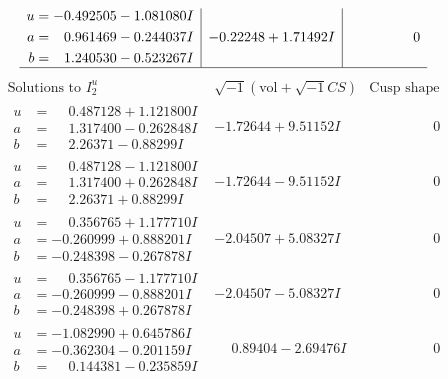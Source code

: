 \documentclass[1p]{elsarticle_modified}
\theoremstyle{definition}
\newcommand{\I}{\sqrt{-1}}
\begin{document}
$$\begin{array}{c|c|c}
\begin{aligned}
u &= -0.492505 - 1.081080 I \\
a &= \phantom{-}0.961469 - 0.244037 I \\
b &= \phantom{-}1.240530 - 0.523267 I\end{aligned}
 & -0.22248 + 1.71492 I & \phantom{-0.000000 } 0\\
 \hline 
 \end{array}$$\newpage$$\begin{array}{c|c|c}  
\text{Solutions to }I^u_{2}& \I (\text{vol} + \sqrt{-1}CS) & \text{Cusp shape}\\
 \hline 
\begin{aligned}
u &= \phantom{-}0.487128 + 1.121800 I \\
a &= \phantom{-}1.317400 - 0.262848 I \\
b &= \phantom{-}2.26371 - 0.88299 I\end{aligned}
 & -1.72644 + 9.51152 I & \phantom{-0.000000 } 0 \\ \hline\begin{aligned}
u &= \phantom{-}0.487128 - 1.121800 I \\
a &= \phantom{-}1.317400 + 0.262848 I \\
b &= \phantom{-}2.26371 + 0.88299 I\end{aligned}
 & -1.72644 - 9.51152 I & \phantom{-0.000000 } 0 \\ \hline\begin{aligned}
u &= \phantom{-}0.356765 + 1.177710 I \\
a &= -0.260999 + 0.888201 I \\
b &= -0.248398 - 0.267878 I\end{aligned}
 & -2.04507 + 5.08327 I & \phantom{-0.000000 } 0 \\ \hline\begin{aligned}
u &= \phantom{-}0.356765 - 1.177710 I \\
a &= -0.260999 - 0.888201 I \\
b &= -0.248398 + 0.267878 I\end{aligned}
 & -2.04507 - 5.08327 I & \phantom{-0.000000 } 0 \\ \hline\begin{aligned}
u &= -1.082990 + 0.645786 I \\
a &= -0.362304 - 0.201159 I \\
b &= \phantom{-}0.144381 - 0.235859 I\end{aligned}
 & \phantom{-}0.89404 - 2.69476 I & \phantom{-0.000000 } 0 \\ \hline\begin{aligned}

\end{aligned}
\end{array}$$
\end{document}
